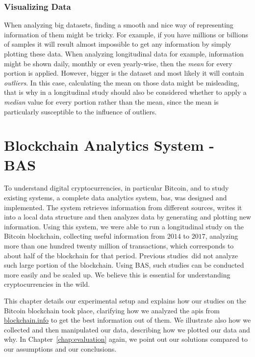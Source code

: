 \documentclass[USenglish]{uit-thesis}
\begin{document}
\subsection{Visualizing Data}
When analyzing big datasets, finding a smooth and nice way of
representing information of them might be tricky. For example, if
you have millions or billions of samples it will result
almost impossible to get any information by simply plotting these data.
When analyzing longitudinal data for example, information
might be shown daily, monthly or even yearly-wise, then the
\emph{mean} for every portion is applied. However, bigger
is the dataset and most likely it will contain \emph{outliers}.
In this case, calculating the mean on those data
might be misleading, that is why in a longitudinal study
should also be considered whether to apply a \emph{median} value
for every portion rather than the mean, since the mean is particularly
susceptible to the influence of outliers.


\chapter{Blockchain Analytics System - BAS}
\label{chap:expsetup}
To understand digital cryptocurrencies,
in particular Bitcoin, and to study existing systems,
a complete data analytics
system, \gls{bas}, was designed and implemented.
The system retrieves information from different sources,
writes it into a local data structure and then
analyzes data by generating and plotting new information.
Using this system, we were able to run a longitudinal study
on the Bitcoin blockchain, collecting useful
information from $2014$ to $2017$, analyzing more
than one hundred twenty million of transactions,
which corresponds to about half of the blockchain for that period.
Previous studies\,\cite{Moser2015, Decker2013IPBN} did not
analyze such large portion of the blockchain.
Using BAS, such studies can be
conducted more easily and
be scaled up. We believe this is essential for
understanding cryptocurrencies in the wild.

This chapter details our experimental setup and
explains how our studies on the Bitcoin
blockchain took place, clarifying how
we analyzed the \gls{api}s from
\url{blockchain.info} to get the
best information out of them.
We illustrate also how we collected
and then manipulated our data, describing
how we plotted
our data and why. In Chapter~\ref{chap:evaluation} again,
we point out our solutions compared to our
assumptions and our conclusions.
\end{document}
